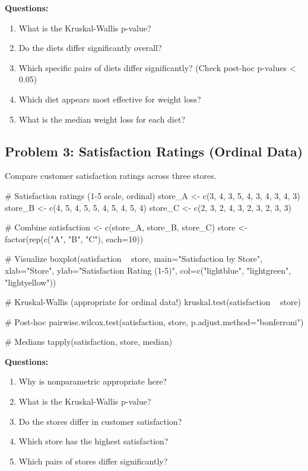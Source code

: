 \documentclass[11pt]{article}
\begin{document}
\textbf{Questions:}
\begin{enumerate}
\item What is the Kruskal-Wallis p-value?
\item Do the diets differ significantly overall?
\item Which specific pairs of diets differ significantly? (Check post-hoc p-values < 0.05)
\item Which diet appears most effective for weight loss?
\item What is the median weight loss for each diet?
\end{enumerate}

\vspace{1cm}

\subsection{Problem 3: Satisfaction Ratings (Ordinal Data)}

Compare customer satisfaction ratings across three stores.

\begin{rcode}
# Satisfaction ratings (1-5 scale, ordinal)
store_A <- c(3, 4, 3, 5, 4, 3, 4, 3, 4, 3)
store_B <- c(4, 5, 4, 5, 5, 4, 5, 4, 5, 4)
store_C <- c(2, 3, 2, 4, 3, 2, 3, 2, 3, 3)

# Combine
satisfaction <- c(store_A, store_B, store_C)
store <- factor(rep(c("A", "B", "C"), each=10))

# Visualize
boxplot(satisfaction ~ store,
        main="Satisfaction by Store",
        xlab="Store",
        ylab="Satisfaction Rating (1-5)",
        col=c("lightblue", "lightgreen", "lightyellow"))

# Kruskal-Wallis (appropriate for ordinal data!)
kruskal.test(satisfaction ~ store)

# Post-hoc
pairwise.wilcox.test(satisfaction, store, p.adjust.method="bonferroni")

# Medians
tapply(satisfaction, store, median)
\end{rcode}

\textbf{Questions:}
\begin{enumerate}
\item Why is nonparametric appropriate here?
\item What is the Kruskal-Wallis p-value?
\item Do the stores differ in customer satisfaction?
\item Which store has the highest satisfaction?
\item Which pairs of stores differ significantly?
\end{enumerate}
\end{document}
